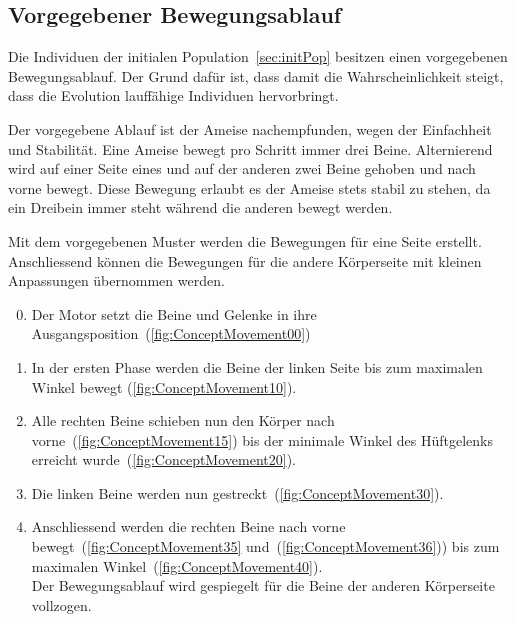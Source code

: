     \subsection{Vorgegebener Bewegungsablauf}

      Die Individuen der initialen Population~\vref{sec:initPop} besitzen einen vorgegebenen Bewegungsablauf.
      Der Grund dafür ist, dass damit die Wahrscheinlichkeit steigt,
      dass die Evolution lauffähige Individuen hervorbringt.

      \medskip

      Der vorgegebene Ablauf ist der Ameise nachempfunden, wegen der Einfachheit und Stabilität.
      Eine Ameise bewegt pro Schritt immer drei Beine.
      Alternierend wird auf einer Seite eines und auf der anderen zwei Beine gehoben und nach vorne bewegt.
      Diese Bewegung erlaubt es der Ameise stets stabil zu stehen,
      da ein Dreibein immer steht während die anderen bewegt werden.

      \medskip

      Mit dem vorgegebenen Muster werden die Bewegungen für eine Seite erstellt.
      Anschliessend können die Bewegungen für die andere Körperseite mit kleinen Anpassungen übernommen werden.

      \begin{enumerate}

        \setcounter{enumi}{-1}

        \item Der Motor setzt die Beine und Gelenke in ihre Ausgangsposition~(\vref{fig:ConceptMovement00})

        \item In der ersten Phase werden die Beine der linken Seite bis zum maximalen Winkel bewegt
          (\vref{fig:ConceptMovement10}).

        \item Alle rechten Beine schieben nun den Körper nach vorne~(\vref{fig:ConceptMovement15}) bis der minimale
          Winkel des Hüftgelenks erreicht wurde~(\vref{fig:ConceptMovement20}).

        \item Die linken Beine werden nun gestreckt~(\vref{fig:ConceptMovement30}).

        \item Anschliessend werden die rechten Beine nach vorne bewegt~(\vref{fig:ConceptMovement35}
          und~(\vref{fig:ConceptMovement36})) bis zum maximalen Winkel~(\vref{fig:ConceptMovement40}).
          \\
          Der Bewegungsablauf wird gespiegelt für die Beine der anderen Körperseite vollzogen.

      \end{enumerate}

